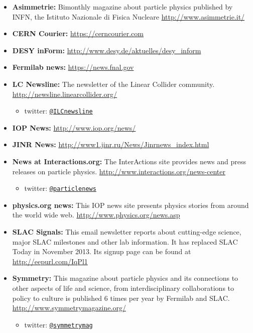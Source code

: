 \begin{itemize}
\item
  \textbf{Asimmetrie:} Bimonthly magazine about particle physics
  published by INFN, the Istituto Nazionale di Fisica Nucleare
  \url{http://www.asimmetrie.it/}
\item
  \textbf{CERN Courier:} \url{https://cerncourier.com}
\item
  \textbf{DESY inForm:} \url{http://www.desy.de/aktuelles/desy_inform}
\item
  \textbf{Fermilab news:} \url{https://news.fnal.gov}
\item
  \textbf{LC Newsline:} The newsletter of the Linear Collider community.
  \url{http://newsline.linearcollider.org/}

  \begin{itemize}
  \tightlist
  \item
    twitter:
    \href{https://twitter.com/ILCnewsline}{\texttt{@ILCnewsline}}
  \end{itemize}
\item
  \textbf{IOP News:} \url{http://www.iop.org/news/}
\item
  \textbf{JINR News:} \url{http://www1.jinr.ru/News/Jinrnews_index.html}
\item
  \textbf{News at Interactions.org:} The InterActions site provides news
  and press releases on particle physics.
  \url{http://www.interactions.org/news-center}

  \begin{itemize}
  \tightlist
  \item
    twitter:
    \href{https://twitter.com/particlenews}{\texttt{@particlenews}}
  \end{itemize}
\item
  \textbf{physics.org news:} This IOP news site presents physics stories
  from around the world wide web. \url{http://www.physics.org/news.asp}
\item
  \textbf{SLAC Signals:} This email newsletter reports about
  cutting-edge science, major SLAC milestones and other lab information.
  It has replaced SLAC Today in November 2013. Its signup page can be
  found at \url{http://eepurl.com/IqPl1}
\item
  \textbf{Symmetry:} This magazine about particle physics and its
  connections to other aspects of life and science, from
  interdisciplinary collaborations to policy to culture is published 6
  times per year by Fermilab and SLAC.
  \url{http://www.symmetrymagazine.org/}

  \begin{itemize}
  \tightlist
  \item
    twitter:
    \href{https://twitter.com/symmetrymag}{\texttt{@symmetrymag}}
  \end{itemize}
\end{itemize}

